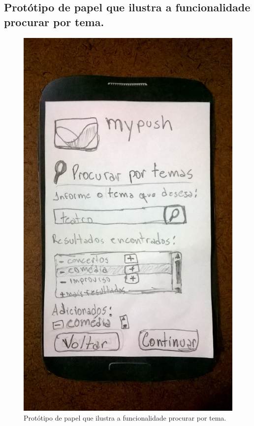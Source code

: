 \begin{anexosenv}
    \pagebreak
    \section*{Protótipo de papel que ilustra a funcionalidade procurar por tema.}
    
      \begin{figure}[!htbp]
	\centering
	\includegraphics[scale=0.32, angle=-90]{editaveis/figuras/prototipo_papel_v1/procurar_por_temas}
	\caption{Protótipo de papel que ilustra a funcionalidade procurar por tema.}
	\label{procurar_por_temas_v1}
      \end{figure}
    

\end{anexosenv}
